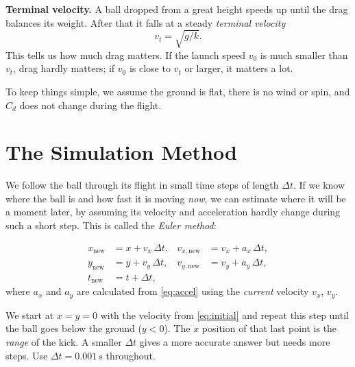 \documentclass[11pt,a4paper]{article}
\begin{document}
\textbf{Terminal velocity.} A ball dropped from a great height speeds up until the drag balances its weight. After that it falls at a steady \emph{terminal velocity}
\begin{equation}
  v_t = \sqrt{g/k} .
  \label{eq:terminal}
\end{equation}
This tells us how much drag matters. If the launch speed $v_0$ is much smaller than $v_t$, drag hardly matters; if $v_0$ is close to $v_t$ or larger, it matters a lot.

To keep things simple, we assume the ground is flat, there is no wind or spin, and $C_d$ does not change during the flight.

\section{The Simulation Method}
We follow the ball through its flight in small time steps of length $\Delta t$. If we know where the ball is and how fast it is moving \emph{now}, we can estimate where it will be a moment later, by assuming its velocity and acceleration hardly change during such a short step. This is called the \emph{Euler method}:

\begin{keyeq}
\vspace{-1.2em}
\begin{align}
  x_\text{new}   &= x   + v_x\,\Delta t, &
  v_{x,\text{new}} &= v_x + a_x\,\Delta t, \nonumber\\
  y_\text{new}   &= y   + v_y\,\Delta t, &
  v_{y,\text{new}} &= v_y + a_y\,\Delta t, \label{eq:euler}\\
  t_\text{new}   &= t + \Delta t, \nonumber
\end{align}
where $a_x$ and $a_y$ are calculated from \eqref{eq:accel} using the \emph{current} velocity $v_x$, $v_y$.
\end{keyeq}

We start at $x = y = 0$ with the velocity from \eqref{eq:initial} and repeat this step until the ball goes below the ground ($y < 0$). The $x$ position of that last point is the \emph{range} of the kick. A smaller $\Delta t$ gives a more accurate answer but needs more steps. Use $\Delta t = \qty{0.001}{\second}$ throughout.

\end{document}
